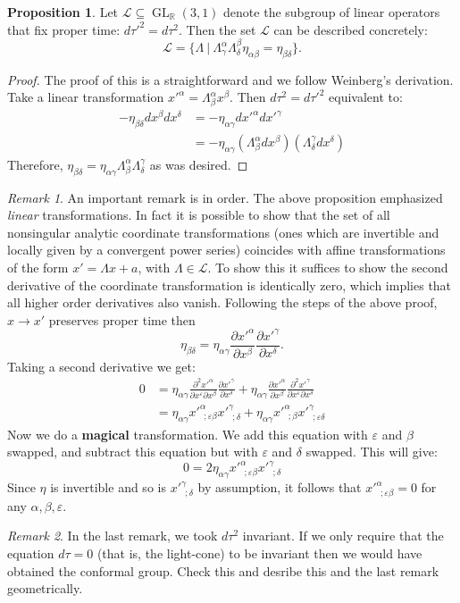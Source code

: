 \documentclass[11pt]{report}
\newcommand{\RR}{\mathbb{R}}
\newcommand{\ms}{\mathscr}
\newcommand{\veps}{\varepsilon}
\newcommand{\FR}[2]{\frac{#1}{#2}}
\newcommand{\PP}[2]{\frac{\di #1}{\di #2}}
\theoremstyle{plain}
\theoremstyle{definition}
\newtheorem{proposition}{Proposition}[section]
\theoremstyle{remark}
\newtheorem{remark}{Remark}[section]
\DeclareMathOperator{\GL}{GL}
\def\seq{\subseteq}
\newcommand{\gam}{\gamma}
\newcommand{\di}{\partial}
\newcommand{\colr}[1]{ {\color{red}  #1 } }
\begin{document}
\begin{proposition} Let $\ms L \seq \GL_\RR(3,1)$ denote the subgroup of linear
operators that fix proper time: $d\tau'^2 = d\tau^2$. Then the set $\ms L$ can
be described concretely:
\[ \ms L = \{ \Lambda\ |\ \Lambda^\alpha_\gamma
\Lambda^\beta_\delta\eta_{\alpha\beta} = \eta_{\beta\delta}\}.\]
\end{proposition}
\begin{proof}
The proof of this is a straightforward and we follow Weinberg's derivation.
Take a linear transformation $x'^\alpha = \Lambda^\alpha_\beta x^\beta$.
Then $d\tau^2 = d\tau'^2$ equivalent to:
\begin{align*}
    -\eta_{\beta\delta} dx^\beta dx^\delta
  &=-\eta_{\alpha\gamma} dx'^\alpha dx'^\gamma\\
  &=-\eta_{\alpha\gamma}(\Lambda^\alpha_\beta dx^\beta)
                        (\Lambda^\gamma_\delta dx^\delta)
\end{align*}
Therefore, $\eta_{\beta\delta} = \eta_{\alpha\gamma} \Lambda^\alpha_\beta
\Lambda^\gamma_\delta$ as was desired. 
\end{proof}

\begin{remark}
An important remark is in order. The above proposition emphasized
\emph{linear} transformations. In fact it is possible to show that the set
of all nonsingular analytic coordinate transformations (ones which are
invertible and locally given by a convergent power series) coincides with
affine transformations of the form $x' = \Lambda x + a$, with
$\Lambda\in\ms L$.  To show this it suffices to show the second derivative
of the coordinate transformation is identically zero, which implies that
all higher order derivatives also vanish. Following the steps of the above
proof, $x \to x'$ preserves proper time then \[ \eta_{\beta\delta} =
\eta_{\alpha\gamma} \PP{x'^\alpha}{x^\beta} \PP{x'^\gamma}{x^\delta}.\]
Taking a second derivative we get:
\begin{align*}
0 &= \eta_{\alpha\gamma}\FR{\di^2 x'^\alpha}{\di x^\veps\di x^\beta}
\PP{x'^\gam}{x^\delta} +\eta_{\alpha\gamma}\PP{x'^\alpha}{x^\beta}
\FR{\di^2 x'^\gam}{\di x^\veps\di x^\delta}\\
&= \eta_{\alpha\gam}x'^\alpha_{\ \ ;\veps\beta} x'^\gam_{\ \ ;\delta}
+\eta_{\alpha\gam}x'^\alpha_{\ \ ;\beta} x'^\gam_{\ \ ;\veps\delta}
\end{align*}
Now we do a \textbf{magical} transformation. We add this equation with
$\veps$ and $\beta$ swapped, and subtract this equation but with $\veps$
and $\delta$ swapped. This will give:
\[0=2\eta_{\alpha\gam} x'^\alpha_{\ \ ;\veps\beta}x'^\gam_{\ \ ;\delta}\]
Since $\eta$ is invertible and so is $x'^\gam_{\ \ ;\delta}$ by assumption,
it follows that $x'^\alpha_{\ \ ;\veps\beta} = 0$ for any
$\alpha,\beta,\veps$. 
\end{remark}

\begin{remark} In the last remark, we took $d\tau^2$ invariant. If we only
require that the equation $d\tau = 0$ (that is, the light-cone) to be
invariant then we would have obtained the conformal group. \colr{Check
this and desribe this and the last remark geometrically.}
\end{remark}
\end{document}
